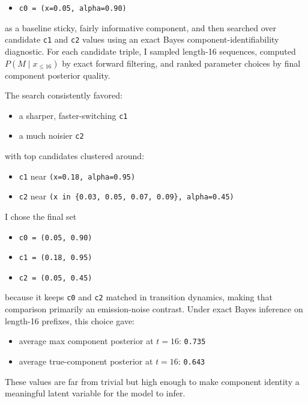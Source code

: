 \documentclass[11pt]{article}
\begin{document}
\begin{itemize}
  \item \texttt{c0 = (x=0.05, alpha=0.90)}
\end{itemize}

as a baseline sticky, fairly informative component, and then searched over candidate \texttt{c1} and \texttt{c2} values using an exact Bayes component-identifiability diagnostic. For each candidate triple, I sampled length-16 sequences, computed $P(M \mid x_{\le 16})$ by exact forward filtering, and ranked parameter choices by final component posterior quality.

The search consistently favored:

\begin{itemize}
  \item a sharper, faster-switching \texttt{c1}
  \item a much noisier \texttt{c2}
\end{itemize}

with top candidates clustered around:

\begin{itemize}
  \item \texttt{c1} near \texttt{(x=0.18, alpha=0.95)}
  \item \texttt{c2} near \texttt{(x in \{0.03, 0.05, 0.07, 0.09\}, alpha=0.45)}
\end{itemize}

I chose the final set

\begin{itemize}
  \item \texttt{c0 = (0.05, 0.90)}
  \item \texttt{c1 = (0.18, 0.95)}
  \item \texttt{c2 = (0.05, 0.45)}
\end{itemize}

because it keeps \texttt{c0} and \texttt{c2} matched in transition dynamics, making that comparison primarily an emission-noise contrast. Under exact Bayes inference on length-16 prefixes, this choice gave:

\begin{itemize}
  \item average max component posterior at $t=16$: \texttt{0.735}
  \item average true-component posterior at $t=16$: \texttt{0.643}
\end{itemize}

These values are far from trivial but high enough to make component identity a meaningful latent variable for the model to infer.
\end{document}
